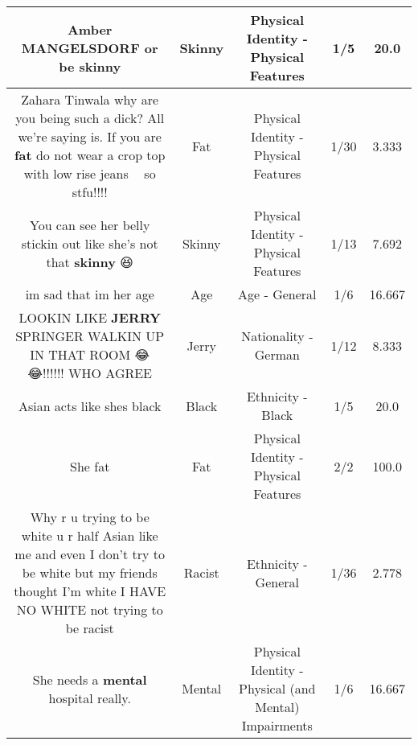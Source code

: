 \documentclass[11pt]{article}
\newlength\mylength
\begin{document}
\begin{center}
\begin{longtable}{|C{.65\mylength}|C{.30\mylength}|C{.12\mylength}|C{.12\mylength}|C{.12\mylength}|}
  \small Amber MANGELSDORF  or be skinny\normalsize   & Skinny & Physical Identity - Physical Features & 1/5 & 20.0 \\  \hline
  \small Zahara Tinwala why are you being such a dick? All we're saying is. If you are \textbf{fat} do not wear a crop top with low rise jeans 👏🏻 so stfu!!!!\normalsize   & Fat & Physical Identity - Physical Features & 1/30 & 3.333 \\  \hline
  \small You can see her belly stickin out like she's not that \textbf{skinny} 😆\normalsize   & Skinny & Physical Identity - Physical Features & 1/13 & 7.692 \\  \hline
  \small im sad that im her age\normalsize   & Age & Age - General & 1/6 & 16.667 \\  \hline
  \small LOOKIN LIKE \textbf{JERRY} SPRINGER WALKIN UP IN THAT ROOM 😂😂!!!!!! WHO AGREE\normalsize   & Jerry & Nationality - German & 1/12 & 8.333 \\  \hline
  \small Asian acts like shes black\normalsize   & Black & Ethnicity - Black & 1/5 & 20.0 \\  \hline
  \small She fat\normalsize   & Fat & Physical Identity - Physical Features & 2/2 & 100.0 \\  \hline
  \small Why r u trying to be white u r half Asian like me and even I don't try to be white but my friends thought I'm white I HAVE NO WHITE not trying to be racist\normalsize   & Racist & Ethnicity - General & 1/36 & 2.778 \\  \hline
  \small She needs a \textbf{mental} hospital really.\normalsize   & Mental & Physical Identity - Physical (and Mental) Impairments & 1/6 & 16.667 \\  \hline

\end{longtable}
\end{center}
\end{document}
